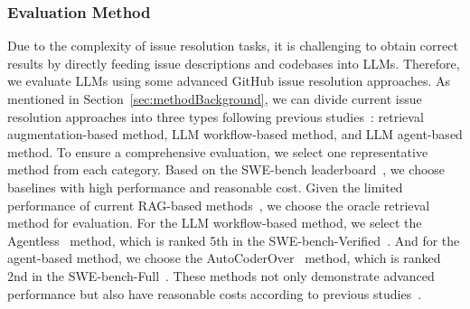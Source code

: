 \begin{table}[t]
  \centering
  \footnotesize
  \setlength\tabcolsep{6pt}  %
     \caption{Overview of evaluated LLMs.}
     \tabmargin
  \renewcommand{\arraystretch}{1.2}  %


 
      \label{table:models}
\end{table}




\subsubsection{Evaluation Method}  
Due to the complexity of issue resolution tasks, it is challenging to obtain correct results by directly feeding issue descriptions and codebases into LLMs. Therefore, we evaluate LLMs using some advanced GitHub issue resolution approaches. As mentioned in Section~\ref{sec:methodBackground}, we can divide current issue resolution approaches into three types following previous studies~\cite{anthropic2024building,ouyang2024repograph,pan2024training}: retrieval augmentation-based method, LLM workflow-based method, and LLM agent-based method. To ensure a comprehensive evaluation, we select one representative method from each category. Based on the SWE-bench leaderboard~\cite{swebench2024leaderboard}, we choose baselines with high performance and reasonable cost. Given the limited performance of current RAG-based methods~\cite{tao2024magis,jimenez2023swe}, we choose the oracle retrieval method for evaluation. For the LLM workflow-based method, we select the Agentless~\cite{xia2024agentless} method, which is ranked 5th in the SWE-bench-Verified~\cite{swebench2024leaderboard}. And for the agent-based method, we choose the AutoCoderOver~\cite{zhang2024autocoderover} method, which is ranked 2nd in the SWE-bench-Full~\cite{swebench2024leaderboard}. These methods not only demonstrate advanced performance but also have reasonable costs according to previous studies~\cite{xia2024agentless}.

